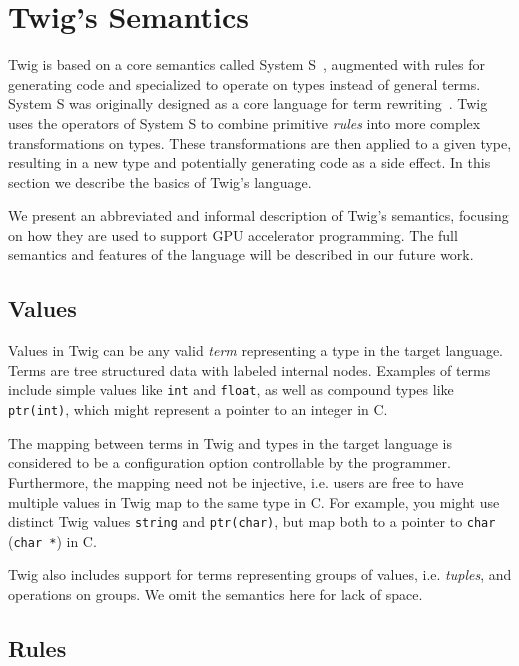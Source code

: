 
\section{Twig's Semantics}
\label{semantics}

Twig is based on a core semantics called System S~\cite{system-s}, augmented with rules for generating code and specialized to operate on types instead of general terms. System S was originally designed as a core language for term rewriting~\cite{baader98rewriting}. Twig uses the operators of System S to combine primitive \emph{rules} into more complex transformations on types. These transformations are then applied to a given type, resulting in a new type and potentially generating code as a side effect. In this section we describe the basics of Twig's language.

We present an abbreviated and informal description of Twig's semantics, focusing on how they are used to support GPU accelerator programming. The full semantics and features of the language will be described in our future work.

\subsection{Values}

Values in Twig can be any valid \emph{term} representing a type in the target language. Terms are tree structured data with labeled internal nodes. Examples of terms include simple values like \texttt{int} and \texttt{float}, as well as compound types like \texttt{ptr(int)}, which might represent a pointer to an integer in C.

The mapping between terms in Twig and types in the target language is considered to be a configuration option controllable by the programmer. Furthermore, the mapping need not be injective, i.e. users are free to have multiple values in Twig map to the same type in C. For example, you might use distinct Twig values \texttt{string} and \texttt{ptr(char)}, but map both to a pointer to \texttt{char} (\texttt{char *}) in C.

Twig also includes support for terms representing groups of values, i.e. \emph{tuples}, and operations on groups. We omit the semantics here for lack of space.

\subsection{Rules}
\label{sec:rules}

